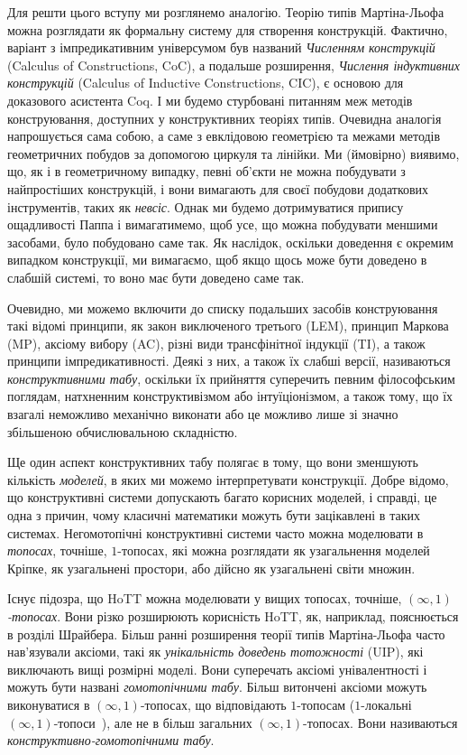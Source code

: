 \documentclass[12pt]{article}
\newcommand*{\inftyone}{\ensuremath{(\infty,1)}}
\begin{document}
Для решти цього вступу ми розглянемо аналогію. Теорію типів Мартіна-Льофа можна розглядати як формальну систему для створення конструкцій. Фактично, варіант з імпредикативним універсумом був названий \emph{Численням конструкцій} (Calculus of Constructions, CoC), а подальше розширення, \emph{Числення індуктивних конструкцій} (Calculus of Inductive Constructions, CIC), є основою для доказового асистента Coq. І ми будемо стурбовані питанням меж методів конструювання, доступних у конструктивних теоріях типів. Очевидна аналогія напрошується сама собою, а саме з евклідовою геометрією та межами методів геометричних побудов за допомогою циркуля та лінійки. Ми (ймовірно) виявимо, що, як і в геометричному випадку, певні об'єкти не можна побудувати з найпростіших конструкцій, і вони вимагають для своєї побудови додаткових інструментів, таких як \emph{невсіс}. Однак ми будемо дотримуватися припису ощадливості Паппа і вимагатимемо, щоб усе, що можна побудувати меншими засобами, було побудовано саме так. Як наслідок, оскільки доведення є окремим випадком конструкції, ми вимагаємо, щоб якщо щось може бути доведено в слабшій системі, то воно має бути доведено саме так.

Очевидно, ми можемо включити до списку подальших засобів конструювання такі відомі принципи, як закон виключеного третього (LEM), принцип Маркова (MP), аксіому вибору (AC), різні види трансфінітної індукції (TI), а також принципи імпредикативності. Деякі з них, а також їх слабші версії, називаються \emph{конструктивними табу}, оскільки їх прийняття суперечить певним філософським поглядам, натхненним конструктивізмом або інтуїціонізмом, а також тому, що їх взагалі неможливо механічно виконати або це можливо лише зі значно збільшеною обчислювальною складністю.

Ще один аспект конструктивних табу полягає в тому, що вони зменшують кількість \emph{моделей}, в яких ми можемо інтерпретувати конструкції. Добре відомо, що конструктивні системи допускають багато корисних моделей, і справді, це одна з причин, чому класичні математики можуть бути зацікавлені в таких системах. Негомотопічні конструктивні системи часто можна моделювати в \emph{топосах}, точніше, $1$-топосах, які можна розглядати як узагальнення моделей Кріпке, як узагальнені простори, або дійсно як узагальнені світи множин.

Існує підозра, що HoTT можна моделювати у вищих топосах, точніше, \emph{\inftyone-топосах}. Вони різко розширюють корисність HoTT, як, наприклад, пояснюється в розділі Шрайбера. Більш ранні розширення теорії типів Мартіна-Льофа часто нав'язували аксіоми, такі як \emph{унікальність доведень тотожності} (UIP), які виключають вищі розмірні моделі. Вони суперечать аксіомі унівалентності і можуть бути названі \emph{гомотопічними табу}. Більш витончені аксіоми можуть виконуватися в \inftyone-топосах, що відповідають $1$-топосам ($1$-локальні \inftyone-топоси~\cite[Розділ~6.4]{LurieHTT}), але не в більш загальних \inftyone-топосах. Вони називаються \emph{конструктивно-гомотопічними табу}.
\end{document}
